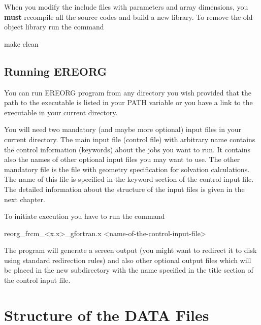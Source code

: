 \documentclass[oneside,11pt,openany]{book}
\newcommand{\tw}{\ttfamily}
\begin{document}
When you modify the include files with parameters and array
dimensions, you {\bf must} recompile all the source codes
and build a new library. To remove the old object library
run the command

\begin{description}
\item {\tw make clean}
\end{description}


\section{Running EREORG}

You can run EREORG program from any directory you wish provided
that the path to the executable is listed in your {\tw PATH}
variable or you have a link to the executable in your current
directory.

You will need two mandatory (and maybe more optional) input files
in your current directory. The main input file (control file)
with arbitrary name contains the control information
(keywords) about the jobs you want to run. It contains
also the names of other optional input files you may
want to use. The other mandatory file is the file
with geometry specification for solvation
calculations. The name of this file is
specified in the keyword section of the control input file.
The detailed information about the structure of the input
files is given in the next chapter.

To initiate execution you have to run the command

\begin{description}
\item {\tw reorg\_frcm\_<x.x>\_gfortran.x <name-of-the-control-input-file>}
\end{description}

The program will generate a screen output (you might want to
redirect it to disk using standard redirection rules) and
also other optional output files which will be placed
in the new subdirectory with the name specified in the title
section of the control input file.


\chapter{Structure of the DATA Files}

\end{document}
